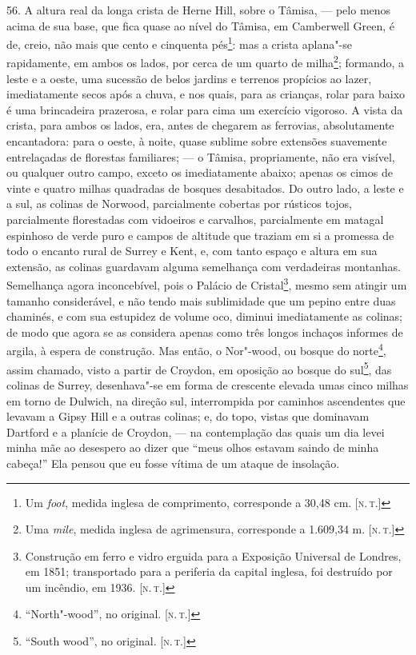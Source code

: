 56. A altura real da longa crista de Herne Hill, sobre o Tâmisa, --- pelo
menos acima de sua base, que fica quase ao nível do Tâmisa, em
Camberwell Green, é de, creio, não mais que cento e cinquenta
pés\footnote{Um \emph{foot}, medida inglesa de comprimento, corresponde
  a 30,48 cm. {[}\textsc{n.\,t.}{]}}: mas a crista aplana"-se rapidamente, em
ambos os lados, por cerca de um quarto de milha\footnote{Uma
  \emph{mile}, medida inglesa de agrimensura, corresponde a 1.609,34 m.
  {[}\textsc{n.\,t.}{]}}; formando, a leste e a oeste, uma sucessão de belos
jardins e terrenos propícios ao lazer, imediatamente secos após a chuva,
e nos quais, para as crianças, rolar para baixo é uma brincadeira
prazerosa, e rolar para cima um exercício vigoroso. A vista da crista,
para ambos os lados, era, antes de chegarem as ferrovias, absolutamente
encantadora: para o oeste, à noite, quase sublime sobre extensões
suavemente entrelaçadas de florestas familiares; --- o Tâmisa,
propriamente, não era visível, ou qualquer outro campo, exceto os
imediatamente abaixo; apenas os cimos de vinte e quatro milhas quadradas
de bosques desabitados. Do outro lado, a leste e a sul, as colinas de
Norwood, parcialmente cobertas por rústicos tojos, parcialmente
florestadas com vidoeiros e carvalhos, parcialmente em matagal espinhoso
de verde puro e campos de altitude que traziam em si a promessa de todo
o encanto rural de Surrey e Kent, e, com tanto espaço e altura em sua
extensão, as colinas guardavam alguma semelhança com verdadeiras
montanhas. Semelhança agora inconcebível, pois o Palácio de
Cristal\footnote{Construção em ferro e vidro erguida para a Exposição
  Universal de Londres, em 1851; transportado para a periferia da
  capital inglesa, foi destruído por um incêndio, em 1936. {[}\textsc{n.\,t.}{]}}, mesmo sem atingir um tamanho considerável, e não tendo mais
sublimidade que um pepino entre duas chaminés, e com sua estupidez de
volume oco, diminui imediatamente as colinas; de modo que agora se as
considera apenas como três longos inchaços informes de argila, à espera
de construção. Mas então, o Nor"-wood, ou bosque do norte\footnote{``North"-wood'',
  no original. {[}\textsc{n.\,t.}{]}}, assim chamado, visto a partir de
Croydon, em oposição ao bosque do sul\footnote{``South wood'', no
  original. {[}\textsc{n.\,t.}{]}}, das colinas de Surrey, desenhava"-se em
forma de crescente elevada umas cinco milhas em torno de Dulwich, na
direção sul, interrompida por caminhos ascendentes que levavam a Gipsy
Hill e a outras colinas; e, do topo, vistas que dominavam Dartford e a
planície de Croydon, --- na contemplação das quais um dia levei minha mãe
ao desespero ao dizer que ``meus olhos estavam saindo de minha cabeça!''
Ela pensou que eu fosse vítima de um ataque de insolação.


